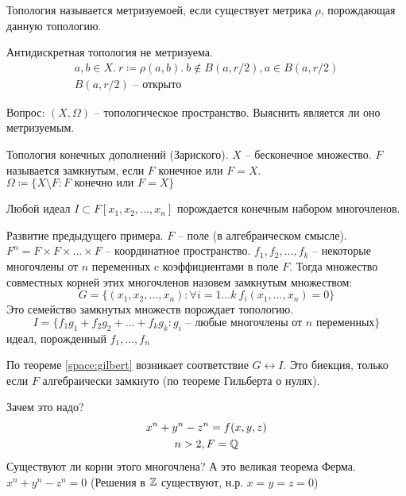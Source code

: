\documentclass[main]{subfiles}
\begin{document}
\begin{definition}
    Топология называется метризуемоей, если существует метрика $\rho$, порождающая
    данную топологию.
\end{definition}

Антидискретная топология не метризуема.
\begin{gather*}
    a, b \in X. \ r \coloneqq \rho(a,b). \ b \not\in B(a, r/2), a \in  B(a, r/2)\\
    B(a, r/2) \text{ -- открыто}
\end{gather*}

Вопрос: $(X, \Omega)$ -- топологическое пространство. Выяснить является ли
оно метризуемым.

\begin{example}
    Топология конечных дополнений (Зариского). $X$ -- бесконечное множество.
    $F$ называется замкнутым, если $F$ конечное или $F=X$.
    $\Omega \coloneqq \{X \setminus F: F \text{ конечно или $F=X$}\}$
\end{example}

\begin{theorem} \label{space:gilbert}
    Любой идеал $I \subset F[x_1, x_2, ..., x_n]$ порождается конечным набором многочленов.
\end{theorem}

\begin{example}
    Развитие предыдущего примера. $F$ -- поле (в алгебраическом смысле).
    $F^n = F \times F \times ... \times F$ -- координатное пространство.
    $f_1, f_2, ..., f_k$ -- некоторые многочлены от $n$ переменных c коэффициентами в поле $F$.
    Тогда множество совместных корней этих многочленов назовем замкнутым множеством:
    \[G = \{(x_1, x_2,..., x_n): \forall i = 1...k \  f_i (x_1,..., x_n) = 0\}\]
    Это семейство замкнутых множеств порождает топологию.
    \[I = \{f_1 g_1 + f_2 g_2 + ... + f_k g_k : g_i \text{ -- любые многочлены от $n$ переменных}\}\]
    идеал, порожденный $f_1,...,f_n$

    По теореме \ref{space:gilbert} возникает соответствие $G \leftrightarrow I$.
    Это биекция, только если $F$ алгебраически замкнуто (по теореме Гильберта о нулях).

    Зачем это надо?
    \begin{gather*}
        x^n + y^n - z^n = f(x,y,z)\\
        n > 2, F = \mathbb{Q}
    \end{gather*}
    Существуют ли корни этого многочлена?
    А это великая теорема Ферма.
    $x^n + y^n - z^n = 0$
    (Решения в $\mathbb{Z}$ существуют, н.р. $x=y=z=0$)
\end{example}
\end{document}
